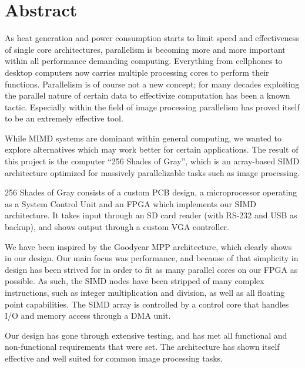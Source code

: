 \begingroup
\let\clearpage\relax
\let\cleardoublepage\relax
\let\cleardoublepage\relax

\chapter*{Abstract}
As heat generation and power consumption starts to limit speed and effectiveness
of single core architectures, parallelism is becoming more and more important
within all performance demanding computing. Everything from cellphones to
desktop computers now carries multiple processing cores to perform their
functions. Parallelism is of course not a new concept; for many decades
exploiting the parallel nature of certain data to effectivize computation has
been a known tactic. Especially within the field of image processing
parallelism has proved itself to be an extremely effective tool.

While MIMD systems are dominant within general computing, we wanted to explore
alternatives which may work better for certain applications. The result of this
project is the computer ``256 Shades of Gray'', which is
an array-based SIMD architecture optimized for massively parallelizable tasks
such as image processing.

256 Shades of Gray consists of a custom PCB design, a microprocessor operating
as a System Control Unit and an FPGA which implements our SIMD architecture. It
takes input through an SD card reader (with RS-232 and USB as backup), and shows
output through a custom VGA controller.

We have been inspired by the Goodyear MPP architecture, which clearly shows in
our design. Our main focus was performance, and because of that simplicity in
design has been strived for in order to fit as many parallel cores on our FPGA
as possible. As such, the SIMD nodes have been stripped of many
complex instructions, such as integer multiplication and division, as well as
all floating point capabilities. The SIMD array is controlled by a control core
that handles I/O and memory access through a DMA unit.

Our design has gone through extensive testing, and has met all functional and
non-functional requirements that were set. The architecture has shown itself
effective and well suited for common image processing tasks.
\endgroup
